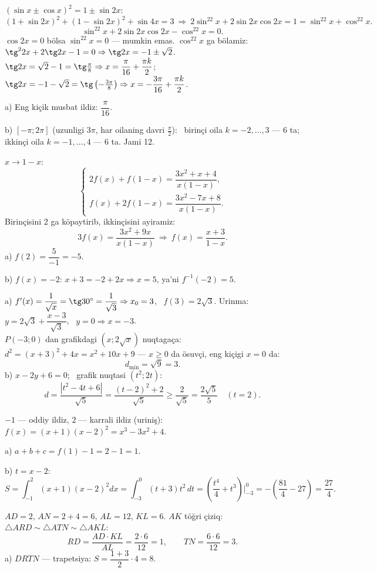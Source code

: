\newpage
{}
$(\sin x\pm\cos x)^2=1\pm\sin2x$:
\[(1+\sin2x)^2+(1-\sin2x)^2+\sin4x=3\ \Rightarrow\ 2\sin^22x+2\sin2x\cos2x=1=\sin^22x+\cos^22x.\]
\[\sin^22x+2\sin2x\cos2x-\cos^22x=0.\]
$\cos2x=0$ bölsa $\sin^22x=0$ — mumkin emas. $\cos^22x$ ga bölamiz: $\tg^22x+2\tg2x-1=0\Rightarrow\tg2x=-1\pm\sqrt2$.\\
$\tg2x=\sqrt2-1=\tg\frac\pi8\Rightarrow x=\dfrac\pi{16}+\dfrac{\pi k}2$; \quad $\tg2x=-1-\sqrt2=\tg\left(-\frac{3\pi}8\right)\Rightarrow x=-\dfrac{3\pi}{16}+\dfrac{\pi k}2$.

a) Eng kiçik musbat ildiz: $\dfrac\pi{16}$.

b) $[-\pi;2\pi]$ (uzunligi $3\pi$, har oilaning davri $\frac\pi2$): \ birinçi oila $k=-2,\dots,3$ — 6 ta; ikkinçi oila $k=-1,\dots,4$ — 6 ta. Jami 12.

\newpage
{}
$x\to1-x$:
\[\begin{cases}2f(x)+f(1-x)=\dfrac{3x^2+x+4}{x(1-x)},\\[6pt] f(x)+2f(1-x)=\dfrac{3x^2-7x+8}{x(1-x)}.\end{cases}\]
Birinçisini 2 ga köpaytirib, ikkinçisini ayiramiz:
\[3f(x)=\frac{3x^2+9x}{x(1-x)}\ \Rightarrow\ f(x)=\frac{x+3}{1-x}.\]
a) $f(2)=\dfrac5{-1}=-5$.

b) $f(x)=-2$: $x+3=-2+2x\Rightarrow x=5$, ya'ni $f^{-1}(-2)=5$.

\newpage
{}
a) $f'(x)=\dfrac1{\sqrt x}=\tg30^\circ=\dfrac1{\sqrt3}\Rightarrow x_0=3$, \ $f(3)=2\sqrt3$. Urinma: $y=2\sqrt3+\dfrac{x-3}{\sqrt3}$, \ $y=0\Rightarrow x=-3$.\\
$P(-3;0)$ dan grafikdagi $(x;2\sqrt x)$ nuqtagaça: $d^2=(x+3)^2+4x=x^2+10x+9$ — $x\ge0$ da ösuvçi, eng kiçigi $x=0$ da:
\[d_{\min}=\sqrt9=3.\]
b) $x-2y+6=0$; \ grafik nuqtasi $(t^2;2t)$:
\[d=\frac{|t^2-4t+6|}{\sqrt5}=\frac{(t-2)^2+2}{\sqrt5}\ge\frac2{\sqrt5}=\frac{2\sqrt5}5\quad(t=2).\]

\newpage
{}
$-1$ — oddiy ildiz, $2$ — karrali ildiz (uriniş): $f(x)=(x+1)(x-2)^2=x^3-3x^2+4$.

a) $a+b+c=f(1)-1=2-1=1$.

b) $t=x-2$:
\[S=\int_{-1}^2(x+1)(x-2)^2dx=\int_{-3}^0(t+3)t^2\,dt=\left(\frac{t^4}4+t^3\right)\Big|_{-3}^0=-\left(\frac{81}4-27\right)=\frac{27}4.\]

\newpage
{}
$AD=2$, $AN=2+4=6$, $AL=12$, $KL=6$. $AK$ töğri çiziq: $\triangle ARD\sim\triangle ATN\sim\triangle AKL$:
\[RD=\frac{AD\cdot KL}{AL}=\frac{2\cdot6}{12}=1,\qquad TN=\frac{6\cdot6}{12}=3.\]
a) $DRTN$ — trapetsiya: $S=\dfrac{1+3}2\cdot4=8$.

